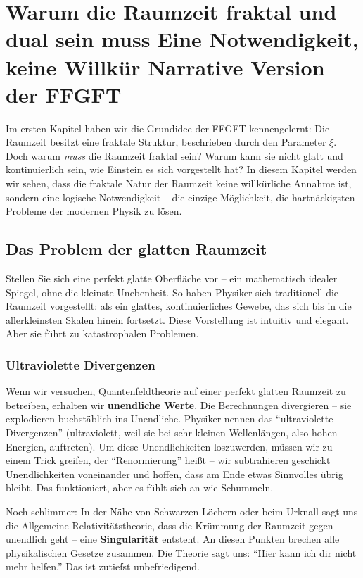 \chapter{Warum die Raumzeit fraktal und dual sein muss  Eine Notwendigkeit, keine Willkür  Narrative Version der FFGFT}



Im ersten Kapitel haben wir die Grundidee der FFGFT kennengelernt: Die Raumzeit besitzt eine fraktale Struktur, beschrieben durch den Parameter $\xi$. Doch warum \textit{muss} die Raumzeit fraktal sein? Warum kann sie nicht glatt und kontinuierlich sein, wie Einstein es sich vorgestellt hat? In diesem Kapitel werden wir sehen, dass die fraktale Natur der Raumzeit keine willkürliche Annahme ist, sondern eine logische Notwendigkeit – die einzige Möglichkeit, die hartnäckigsten Probleme der modernen Physik zu lösen.

\section{Das Problem der glatten Raumzeit}

Stellen Sie sich eine perfekt glatte Oberfläche vor – ein mathematisch idealer Spiegel, ohne die kleinste Unebenheit. So haben Physiker sich traditionell die Raumzeit vorgestellt: als ein glattes, kontinuierliches Gewebe, das sich bis in die allerkleinsten Skalen hinein fortsetzt. Diese Vorstellung ist intuitiv und elegant. Aber sie führt zu katastrophalen Problemen.

\subsection{Ultraviolette Divergenzen}

Wenn wir versuchen, Quantenfeldtheorie auf einer perfekt glatten Raumzeit zu betreiben, erhalten wir \textbf{unendliche Werte}. Die Berechnungen divergieren – sie explodieren buchstäblich ins Unendliche. Physiker nennen das \enquote{ultraviolette Divergenzen} (ultraviolett, weil sie bei sehr kleinen Wellenlängen, also hohen Energien, auftreten). Um diese Unendlichkeiten loszuwerden, müssen wir zu einem Trick greifen, der \enquote{Renormierung} heißt – wir subtrahieren geschickt Unendlichkeiten voneinander und hoffen, dass am Ende etwas Sinnvolles übrig bleibt. Das funktioniert, aber es fühlt sich an wie Schummeln.

Noch schlimmer: In der Nähe von Schwarzen Löchern oder beim Urknall sagt uns die Allgemeine Relativitätstheorie, dass die Krümmung der Raumzeit gegen unendlich geht – eine \textbf{Singularität} entsteht. An diesen Punkten brechen alle physikalischen Gesetze zusammen. Die Theorie sagt uns: \enquote{Hier kann ich dir nicht mehr helfen.} Das ist zutiefst unbefriedigend.

